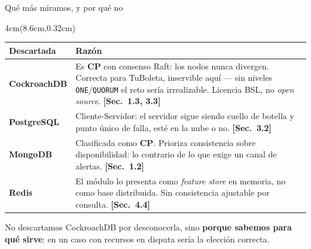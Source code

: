 \documentclass[aspectratio=169,11pt]{beamer}
\newcommand{\sect}[1]{\textcolor{acento}{\small\textbf{[Sec.~#1]}}}
\newcommand{\quien}[1]{%
  \begin{textblock*}{4cm}(8.6cm,0.32cm)
    \tiny\textcolor{white}{\textbf{#1}}
  \end{textblock*}}
\begin{document}
\begin{frame}{Qué más miramos, y por qué no}
\quien{Nilton}
\footnotesize
\begin{tabular}{@{}p{2.5cm}p{8.4cm}@{}}
\toprule
\textbf{Descartada} & \textbf{Razón} \\
\midrule
\textbf{CockroachDB} &
Es \textcolor{rojo}{\textbf{CP}} con consenso Raft: los nodos nunca divergen.
Correcta para TuBoleta, inservible aquí — sin niveles \texttt{ONE}/\texttt{QUORUM}
el reto sería irrealizable. Licencia BSL, no \emph{open source}. \sect{1.3, 3.3} \\
\addlinespace
\textbf{PostgreSQL} &
Cliente-Servidor: el servidor sigue siendo cuello de botella y punto único de
falla, esté en la nube o no. \sect{3.2} \\
\addlinespace
\textbf{MongoDB} &
Clasificada como \textcolor{rojo}{\textbf{CP}}. Prioriza consistencia sobre
disponibilidad: lo contrario de lo que exige un canal de alertas. \sect{1.2} \\
\addlinespace
\textbf{Redis} &
El módulo lo presenta como \emph{feature store} en memoria, no como base
distribuida. Sin consistencia ajustable por consulta. \sect{4.4} \\
\bottomrule
\end{tabular}

\vspace{5pt}
\begin{block}{\small}
\footnotesize
No descartamos CockroachDB por desconocerla, sino \textbf{porque sabemos para qué
sirve}: en un caso con recursos en disputa sería la elección correcta.
\end{block}
\end{frame}
\end{document}
